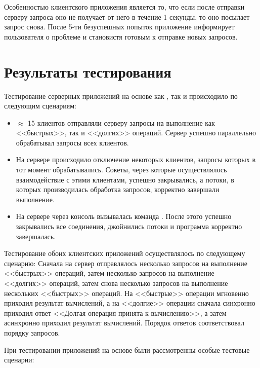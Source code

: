 Особенностью клиентского приложения является то, что если после отправки серверу запроса оно не получает от него  в течение 1 секунды, то оно посылает запрос снова. После 5-ти безуспешных попыток приложение информирует пользователя о проблеме и становистя готовым к отправке новых запросов.

\section{Результаты тестирования}

Тестирование серверных приложений на основе как , так и  происходило по следующим сценариям:

\begin{itemize}
	\item $\approx$ 15 клиентов отправляли серверу запросы на выполнение как <<быстрых>>, так и <<долгих>> операций. Сервер успешно параллельно обрабатывал запросы всех клиентов.
	\item На сервере происходило отключение некоторых клиентов, запросы которых в тот момент обрабатывались. Сокеты, через которые осуществлялось взаимодействие с этими клиентами, успешно закрывались, а потоки, в которых производилась обработка запросов, корректно завершали выполнение.
	\item На сервере через консоль вызывалась команда . После этого успешно закрывались все соединения, джойнились потоки и программа корректно завершалась.
\end{itemize}

Тестирование обоих клиентских приложений осуществлялось по следующему сценарию: Сначала на сервер отправлялось несколько запросов на выполнение <<быстрых>> операций, затем несколько запросов на выполнение <<долгих>> операций, затем снова несколько запросов на выполнение нескольких <<быстрых>> операций. На <<быстрые>> операции мгновенно приходил результат вычислений, а на <<долгие>> операции сначала синхронно приходил ответ <<Долгая операция принята к вычислению>>, а затем асинхронно приходил результат вычислений. Порядок ответов соответствовал порядку запросов.

При тестировании приложений на основе  были рассмотренны особые тестовые сценарии:


